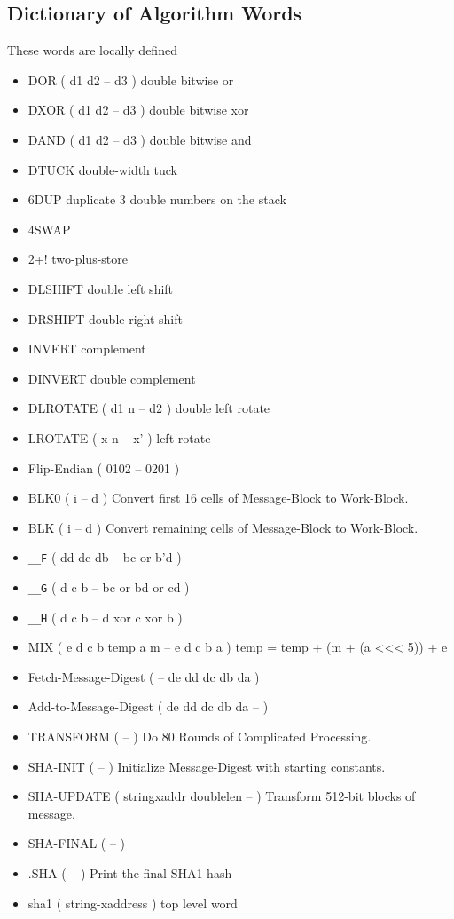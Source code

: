 \subsection{Dictionary of Algorithm Words}
These words are locally defined
\begin{itemize}
\item DOR ( d1 d2 -- d3 ) double bitwise or
\item DXOR ( d1 d2 -- d3 ) double bitwise xor
\item DAND ( d1 d2 -- d3 ) double bitwise and
\item DTUCK double-width tuck
\item 6DUP duplicate 3 double numbers on the stack
\item 4SWAP
\item 2+! two-plus-store
\item DLSHIFT double left shift
\item DRSHIFT double right shift
\item INVERT complement
\item DINVERT double complement
\item DLROTATE ( d1 n -- d2 ) double left rotate
\item LROTATE ( x n -- x' ) left rotate
\item Flip-Endian ( 0102 -- 0201 )
\item BLK0 ( i -- d ) Convert first 16 cells of Message-Block to Work-Block.
\item BLK ( i -- d ) Convert remaining cells of Message-Block to Work-Block. 
\item \verb|__F| ( dd dc db -- bc or b'd )
\item \verb|__G| ( d c b -- bc or bd or cd )
\item \verb|__H| ( d c b -- d xor c xor b )
\item MIX ( e d c b temp a m -- e d c b a ) temp = temp + (m + (a <<< 5)) + e
\item Fetch-Message-Digest ( -- de dd dc db da )
\item Add-to-Message-Digest  ( de dd dc db da -- )
\item TRANSFORM ( -- ) Do 80 Rounds of Complicated Processing.
\item SHA-INIT ( -- ) Initialize Message-Digest with starting constants.
\item SHA-UPDATE ( stringxaddr doublelen -- ) Transform 512-bit blocks of message.
\item SHA-FINAL ( -- )
\item .SHA ( -- ) Print the final SHA1 hash
\item sha1 ( string-xaddress ) top level word
\end{itemize}



